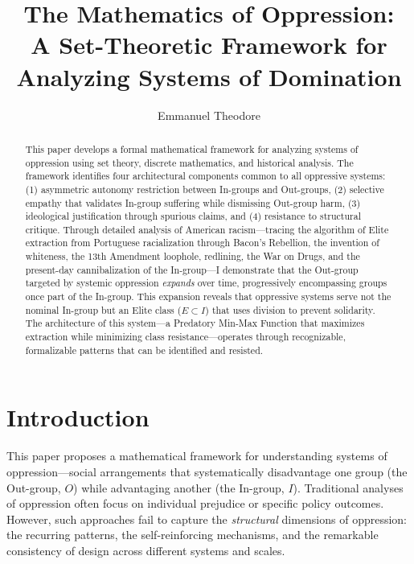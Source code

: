 \documentclass[12pt]{article}
\title{The Mathematics of Oppression:\\A Set-Theoretic Framework for Analyzing Systems of Domination}
\author{Emmanuel Theodore}
\date{}
\begin{document}
\maketitle

\begin{abstract}
This paper develops a formal mathematical framework for analyzing systems of oppression using set theory, discrete mathematics, and historical analysis. The framework identifies four architectural components common to all oppressive systems: (1) asymmetric autonomy restriction between In-groups and Out-groups, (2) selective empathy that validates In-group suffering while dismissing Out-group harm, (3) ideological justification through spurious claims, and (4) resistance to structural critique. Through detailed analysis of American racism---tracing the algorithm of Elite extraction from Portuguese racialization through Bacon's Rebellion, the invention of whiteness, the 13th Amendment loophole, redlining, the War on Drugs, and the present-day cannibalization of the In-group---I demonstrate that the Out-group targeted by systemic oppression \textit{expands} over time, progressively encompassing groups once part of the In-group. This expansion reveals that oppressive systems serve not the nominal In-group but an Elite class ($E \subset I$) that uses division to prevent solidarity. The architecture of this system---a Predatory Min-Max Function that maximizes extraction while minimizing class resistance---operates through recognizable, formalizable patterns that can be identified and resisted.
\end{abstract}

\section{Introduction}

This paper proposes a mathematical framework for understanding systems of oppression---social arrangements that systematically disadvantage one group (the Out-group, $O$) while advantaging another (the In-group, $I$). Traditional analyses of oppression often focus on individual prejudice or specific policy outcomes. However, such approaches fail to capture the \textit{structural} dimensions of oppression: the recurring patterns, the self-reinforcing mechanisms, and the remarkable consistency of design across different systems and scales.
\end{document}
